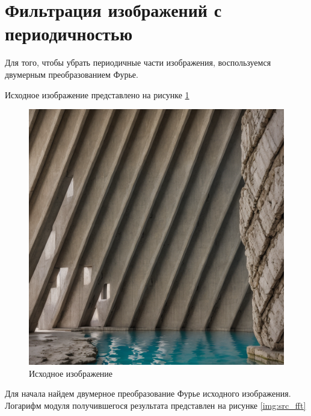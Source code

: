 \section{Фильтрация изображений с периодичностью}

Для того, чтобы убрать периодичные части изображения, воспользуемся двумерным преобразованием Фурье. 

Исходное изображение представлено на рисунке \ref{img:src}

\begin{figure}[ht!]
    \centering
    \includegraphics[width=\textwidth]{8.png}
    \caption{Исходное изображение}
    \label{img:src}
\end{figure}

Для начала найдем двумерное преобразование Фурье исходного изображения. Логарифм модуля получившегося результата представлен на рисунке \ref{img:src_fft} 

